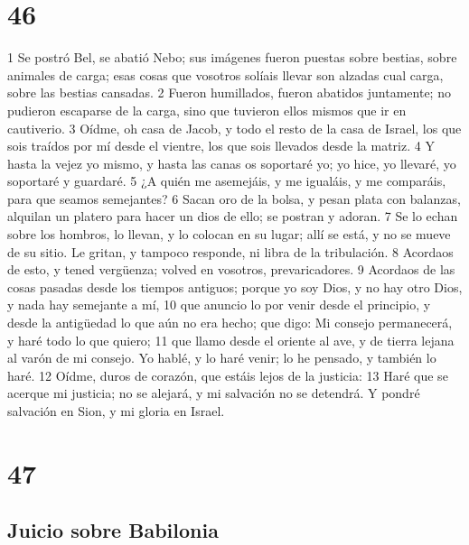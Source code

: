 \chapter{46}

1 Se postró Bel, se abatió Nebo; sus imágenes fueron puestas sobre bestias, sobre animales de carga; esas cosas que vosotros solíais llevar son alzadas cual carga, sobre las bestias cansadas.
2 Fueron humillados, fueron abatidos juntamente; no pudieron escaparse de la carga, sino que tuvieron ellos mismos que ir en cautiverio.
3 Oídme, oh casa de Jacob, y todo el resto de la casa de Israel, los que sois traídos por mí desde el vientre, los que sois llevados desde la matriz.
4 Y hasta la vejez yo mismo, y hasta las canas os soportaré yo; yo hice, yo llevaré, yo soportaré y guardaré.
5 ¿A quién me asemejáis, y me igualáis, y me comparáis, para que seamos semejantes?
6 Sacan oro de la bolsa, y pesan plata con balanzas, alquilan un platero para hacer un dios de ello; se postran y adoran.
7 Se lo echan sobre los hombros, lo llevan, y lo colocan en su lugar; allí se está, y no se mueve de su sitio. Le gritan, y tampoco responde, ni libra de la tribulación.
8 Acordaos de esto, y tened vergüenza; volved en vosotros, prevaricadores.
9 Acordaos de las cosas pasadas desde los tiempos antiguos; porque yo soy Dios, y no hay otro Dios, y nada hay semejante a mí,
10 que anuncio lo por venir desde el principio, y desde la antigüedad lo que aún no era hecho; que digo: Mi consejo permanecerá, y haré todo lo que quiero;
11 que llamo desde el oriente al ave, y de tierra lejana al varón de mi consejo. Yo hablé, y lo haré venir; lo he pensado, y también lo haré.
12 Oídme, duros de corazón, que estáis lejos de la justicia:
13 Haré que se acerque mi justicia; no se alejará, y mi salvación no se detendrá. Y pondré salvación en Sion, y mi gloria en Israel.

\chapter{47}

\section*{Juicio sobre Babilonia}

